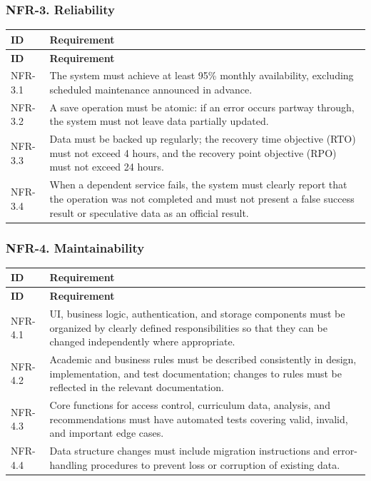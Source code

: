 \subsubsection{NFR-3. Reliability}
\begin{longtable}{|p{}|p{}|}
\hline
\textbf{ID} & \textbf{Requirement} \\
\hline
\endfirsthead
\hline
\textbf{ID} & \textbf{Requirement} \\
\hline
\endhead
NFR-3.1 & The system must achieve at least 95\% monthly availability, excluding scheduled maintenance announced in advance. \\
\hline
NFR-3.2 & A save operation must be atomic: if an error occurs partway through, the system must not leave data partially updated. \\
\hline
NFR-3.3 & Data must be backed up regularly; the recovery time objective (RTO) must not exceed 4 hours, and the recovery point objective (RPO) must not exceed 24 hours. \\
\hline
NFR-3.4 & When a dependent service fails, the system must clearly report that the operation was not completed and must not present a false success result or speculative data as an official result. \\
\hline
\end{longtable}

\subsubsection{NFR-4. Maintainability}
\begin{longtable}{|p{}|p{}|}
\hline
\textbf{ID} & \textbf{Requirement} \\
\hline
\endfirsthead
\hline
\textbf{ID} & \textbf{Requirement} \\
\hline
\endhead
NFR-4.1 & UI, business logic, authentication, and storage components must be organized by clearly defined responsibilities so that they can be changed independently where appropriate. \\
\hline
NFR-4.2 & Academic and business rules must be described consistently in design, implementation, and test documentation; changes to rules must be reflected in the relevant documentation. \\
\hline
NFR-4.3 & Core functions for access control, curriculum data, analysis, and recommendations must have automated tests covering valid, invalid, and important edge cases. \\
\hline
NFR-4.4 & Data structure changes must include migration instructions and error-handling procedures to prevent loss or corruption of existing data. \\
\hline
\end{longtable}

